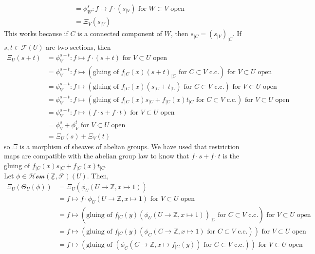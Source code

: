 \documentclass{article}
\newcommand{\Z}{\mathbb{Z}}
\newcommand{\Fsheaf}{\mathscr{F}}
\newcommand{\sheafHom}{\mathcal{Hom}}
\begin{document}
\begin{enumerate}
\begin{align*}
        & = \phi_W^s : f \mapsto f \cdot (s_{\mid V}) \text{ for $W \subset V$ open} \\
        & = \Xi_V(s_{\mid V})
    \end{align*}
    This works because if $C$ is a connected component of $W$, then $s_{\mid C} = (s_{\mid V})_{\mid C}$. If $s,t \in \Fsheaf(U)$ are two sections, then
    \begin{align*}
        \Xi_U (s+t) & = \phi^{s+t}_V : f \mapsto f \cdot (s+t) \text{ for $V \subset U$ open} \\
        & = \phi^{s+t}_V : f \mapsto (\text{gluing of } f_{\mid C}(x)(s+t)_{\mid C} \text{ for $C\subset V$ c.c.}) \text{ for $V \subset U$ open} \\
        & = \phi^{s+t}_V : f \mapsto (\text{gluing of } f_{\mid C}(x)(s_{\mid C} + t_{\mid C}) \text{ for $C\subset V$ c.c.}) \text{ for $V \subset U$ open} \\
        & = \phi^{s+t}_V : f \mapsto (\text{gluing of } f_{\mid C}(x)s_{\mid C} + f_{\mid C}(x)t_{\mid C} \text{ for $C\subset V$ c.c.}) \text{ for $V \subset U$ open} \\
        & = \phi^{s+t}_V : f \mapsto (f \cdot s + f\cdot t) \text{ for $V \subset U$ open} \\
        & = \phi^s_V + \phi^t_V \text{ for $V \subset U$ open} \\
        & = \Xi_U(s) + \Xi_V(t)
    \end{align*}
    so $\Xi$ is a morphism of sheaves of abelian groups. We have used that restriction maps are compatible with the abelian group law to know that $f\cdot s + f \cdot t$ is the gluing of $f_{\mid C}(x)s_{\mid C} + f_{\mid C}(x) t_{\mid C}$. \\
    Let $\phi \in \sheafHom(\underline{\Z},\Fsheaf)(U)$. Then,
    \begin{align*}
        \Xi_U (\Theta_U (\phi)) & = \Xi_U (\phi_U(U\to \Z, x\mapsto 1)) \\
        & = f \mapsto f \cdot \phi_U(U\to \Z, x\mapsto 1) \text{ for $V \subset U$ open} \\
        & = f \mapsto (\text{gluing of } f_{\mid C}(y)(\phi_U(U\to \Z, x\mapsto 1))_{\mid C} \text{ for $C \subset V$ c.c.}) \text{ for $V \subset U$ open} \\
        & = f \mapsto (\text{gluing of } f_{\mid C}(y)(\phi_C (C \to \Z, x \mapsto 1) \text{ for $C \subset V$ c.c.})) \text{ for $V \subset U$ open} \\
        & = f \mapsto (\text{gluing of } (\phi_C (C \to \Z, x \mapsto f_{\mid C}(y)) \text{ for $C \subset V$ c.c.})) \text{ for $V \subset U$ open} \\

\end{align*}
\end{enumerate}
\end{document}
